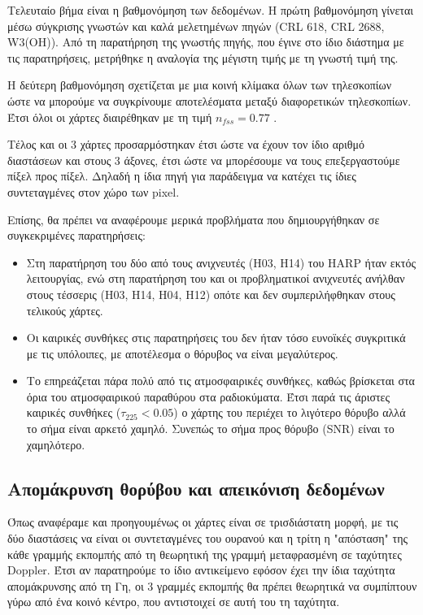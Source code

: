 \documentclass[a4paper,12pt]{memoir}
\begin{document}
Τελευταίο βήμα είναι η βαθμονόμηση των δεδομένων. Η πρώτη βαθμονόμηση γίνεται μέσω σύγκρισης γνωστών και καλά μελετημένων πηγών (CRL 618, CRL 2688, W3(OH)). Από τη παρατήρηση της γνωστής πηγής, που έγινε στο ίδιο διάστημα με τις παρατηρήσεις, μετρήθηκε η αναλογία της μέγιστη τιμής με τη γνωστή τιμή της. 

Η δεύτερη βαθμονόμηση σχετίζεται με μια κοινή κλίμακα όλων των τηλεσκοπίων ώστε να μπορούμε να συγκρίνουμε αποτελέσματα μεταξύ διαφορετικών τηλεσκοπίων. Έτσι όλοι οι χάρτες διαιρέθηκαν με τη τιμή $n_{fss}=0.77$ \cite{buckle_:_2009}. 

Τέλος και οι 3 χάρτες προσαρμόστηκαν έτσι ώστε να έχουν τον ίδιο αριθμό διαστάσεων και στους 3 άξονες, έτσι ώστε να μπορέσουμε να τους επεξεργαστούμε πίξελ προς πίξελ. Δηλαδή η ίδια πηγή για παράδειγμα να κατέχει τις ίδιες συντεταγμένες στον χώρο των pixel.

Επίσης, θα πρέπει να αναφέρουμε μερικά προβλήματα που δημιουργήθηκαν σε συγκεκριμένες παρατηρήσεις:
\begin{itemize}
\item Στη παρατήρηση του  δύο από τους ανιχνευτές (H03, H14) του HARP ήταν εκτός λειτουργίας, ενώ στη παρατήρηση του  και  οι προβληματικοί ανιχνευτές ανήλθαν στους τέσσερις (H03, H14, H04, H12) οπότε και δεν συμπεριλήφθηκαν στους τελικούς χάρτες. 
\item Οι καιρικές συνθήκες στις παρατηρήσεις του  δεν ήταν τόσο ευνοϊκές συγκριτικά με τις υπόλοιπες, με αποτέλεσμα ο θόρυβος να είναι μεγαλύτερος.
\item Το  επηρεάζεται πάρα πολύ από τις ατμοσφαιρικές συνθήκες, καθώς βρίσκεται στα όρια του ατμοσφαιρικού παραθύρου στα ραδιοκύματα. Έτσι παρά τις άριστες καιρικές συνθήκες ($\tau _{225} <0.05$) ο χάρτης του  περιέχει το λιγότερο θόρυβο αλλά το σήμα είναι αρκετό χαμηλό. Συνεπώς το σήμα προς θόρυβο (SNR) είναι το χαμηλότερο.

\end{itemize}

\subsection{Απομάκρυνση θορύβου και απεικόνιση δεδομένων}
Όπως αναφέραμε και προηγουμένως οι χάρτες είναι σε τρισδιάστατη μορφή, με τις δύο διαστάσεις να είναι οι συντεταγμένες του ουρανού και η τρίτη η "απόσταση" της κάθε γραμμής εκπομπής από τη θεωρητική της γραμμή μεταφρασμένη σε ταχύτητες Doppler. Έτσι αν παρατηρούμε το ίδιο αντικείμενο εφόσον έχει την ίδια ταχύτητα απομάκρυνσης από τη Γη, οι 3 γραμμές εκπομπής θα πρέπει θεωρητικά να συμπίπτουν γύρω από ένα κοινό κέντρο, που αντιστοιχεί σε αυτή του τη ταχύτητα.
\end{document}

